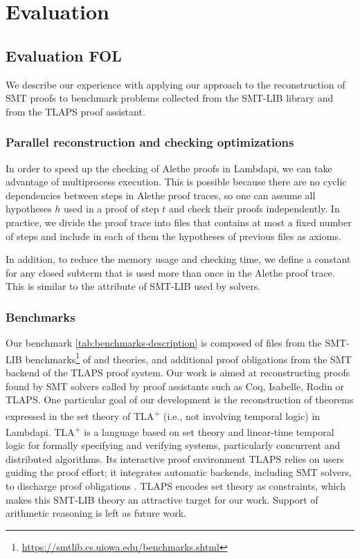 \chapter{Evaluation}\label{ch:evaluation}

\section{Evaluation FOL}
\label{sect:evaluation-fol}

We describe our experience with applying our approach to the reconstruction of SMT proofs to benchmark problems collected from the SMT-LIB library and from the TLAPS proof assistant.

\subsection{Parallel reconstruction and checking optimizations}
\label{ssec:parallel}

In order to speed up the checking of Alethe proofs in Lambdapi, we can take advantage of multiprocess execution.
This is possible because there are no cyclic dependencies between steps in Alethe proof traces, so one can assume all hypotheses $h$ used in a proof of step $t$ and check their proofs independently.
In practice, we divide the proof trace into files that contains at most a fixed number of steps and include in each of them the hypotheses of previous files as axioms.

In addition, to reduce the memory usage and checking time, we define a constant for any closed subterm that is used more than once in the Alethe proof trace.
This is similar to the  attribute of SMT-LIB used by solvers.

\subsection{Benchmarks}

Our benchmark \cref{tab:benchmarks-description} is composed of files from the SMT-LIB benchmarks\footnote{\url{https://smtlib.cs.uiowa.edu/benchmarks.shtml}} of  and  theories, and additional proof obligations from the SMT backend of the TLAPS proof system.
Our work is aimed at reconstructing proofs found by SMT solvers called by proof assistants such as Coq, Isabelle, Rodin or TLAPS. One particular goal of our development is the reconstruction of theorems expressed in the set theory of TLA\textsuperscript{+} (i.e., not involving temporal logic) in Lambdapi.
TLA\textsuperscript{+} \cite{lamport:specifying} is a language based on set theory and linear-time temporal logic for formally specifying and verifying systems, particularly concurrent and distributed algorithms.
Its interactive proof environment TLAPS \cite{tla-proofs} relies on users guiding the proof effort; it integrates automatic backends, including SMT solvers, to discharge proof obligations \cite{smttlaps, ABZrosalie}. TLAPS encodes set theory as  constraints, which makes this SMT-LIB theory an attractive target for our work. Support of arithmetic reasoning is left as future work.

